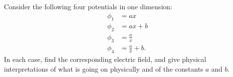Consider the following four potentials in one dimension:
\begin{align*}
  \phi_1 &= ax \\
  \phi_2 &= ax+b \\
  \phi_3 &= \frac{a}{x} \\
  \phi_4 &= \frac{a}{x}+b.
\end{align*}
In each case, find the corresponding electric field, and give physical
interpretations of what is going on physically and of the constants
$a$ and $b$.

